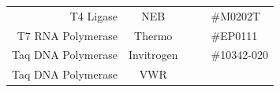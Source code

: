 \documentclass[11pt,singlespacinge,twoside]{reedthesis} %
\begin{document}
\begin{longtable}[]{@{}rccll@{}}
\begin{minipage}[t]{0.24\columnwidth}\raggedleft
T4 Ligase\strut
\end{minipage} & \begin{minipage}[t]{0.16\columnwidth}\centering
NEB\strut
\end{minipage} & \begin{minipage}[t]{0.12\columnwidth}\centering
\strut
\end{minipage} & \begin{minipage}[t]{0.24\columnwidth}\raggedright
\strut
\end{minipage} & \begin{minipage}[t]{0.11\columnwidth}\raggedright
\#M0202T\strut
\end{minipage}\tabularnewline
\begin{minipage}[t]{0.24\columnwidth}\raggedleft
T7 RNA Polymerase\strut
\end{minipage} & \begin{minipage}[t]{0.16\columnwidth}\centering
Thermo\strut
\end{minipage} & \begin{minipage}[t]{0.12\columnwidth}\centering
\strut
\end{minipage} & \begin{minipage}[t]{0.24\columnwidth}\raggedright
\strut
\end{minipage} & \begin{minipage}[t]{0.11\columnwidth}\raggedright
\#EP0111\strut
\end{minipage}\tabularnewline
\begin{minipage}[t]{0.24\columnwidth}\raggedleft
Taq DNA Polymerase\strut
\end{minipage} & \begin{minipage}[t]{0.16\columnwidth}\centering
Invitrogen\strut
\end{minipage} & \begin{minipage}[t]{0.12\columnwidth}\centering
\strut
\end{minipage} & \begin{minipage}[t]{0.24\columnwidth}\raggedright
\strut
\end{minipage} & \begin{minipage}[t]{0.11\columnwidth}\raggedright
\#10342-020\strut
\end{minipage}\tabularnewline
\begin{minipage}[t]{0.24\columnwidth}\raggedleft
Taq DNA Polymerase\strut
\end{minipage} & \begin{minipage}[t]{0.16\columnwidth}\centering
VWR\strut
\end{minipage} & \begin{minipage}[t]{0.12\columnwidth}\centering
\strut
\end{minipage} & \begin{minipage}[t]{0.24\columnwidth}\raggedright
\strut
\end{minipage} & \begin{minipage}[t]{0.11\columnwidth}\raggedright
\strut
\end{minipage}\tabularnewline
\bottomrule
\end{longtable}
\end{document}
